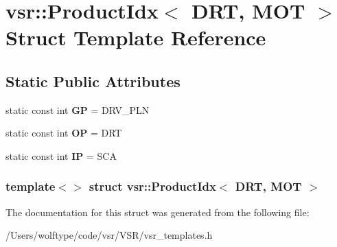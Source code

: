 \hypertarget{structvsr_1_1_product_idx_3_01_d_r_t_00_01_m_o_t_01_4}{\section{vsr\-:\-:Product\-Idx$<$ D\-R\-T, M\-O\-T $>$ Struct Template Reference}
\label{structvsr_1_1_product_idx_3_01_d_r_t_00_01_m_o_t_01_4}
}
\subsection*{Static Public Attributes}
\begin{DoxyCompactItemize}
\item 
\hypertarget{structvsr_1_1_product_idx_3_01_d_r_t_00_01_m_o_t_01_4_a04b48d9e80caba416f461841df9376bf}{static const int {\bfseries G\-P} = D\-R\-V\-\_\-\-P\-L\-N}\label{structvsr_1_1_product_idx_3_01_d_r_t_00_01_m_o_t_01_4_a04b48d9e80caba416f461841df9376bf}

\item 
\hypertarget{structvsr_1_1_product_idx_3_01_d_r_t_00_01_m_o_t_01_4_ae573731743c45ecc82247d17544c0aa4}{static const int {\bfseries O\-P} = D\-R\-T}\label{structvsr_1_1_product_idx_3_01_d_r_t_00_01_m_o_t_01_4_ae573731743c45ecc82247d17544c0aa4}

\item 
\hypertarget{structvsr_1_1_product_idx_3_01_d_r_t_00_01_m_o_t_01_4_a5cba4de1b1e3ab335d87fbe6d3f33edb}{static const int {\bfseries I\-P} = S\-C\-A}\label{structvsr_1_1_product_idx_3_01_d_r_t_00_01_m_o_t_01_4_a5cba4de1b1e3ab335d87fbe6d3f33edb}

\end{DoxyCompactItemize}
\subsubsection*{template$<$$>$ struct vsr\-::\-Product\-Idx$<$ D\-R\-T, M\-O\-T $>$}



The documentation for this struct was generated from the following file\-:\begin{DoxyCompactItemize}
\item 
/\-Users/wolftype/code/vsr/\-V\-S\-R/vsr\-\_\-templates.\-h\end{DoxyCompactItemize}
